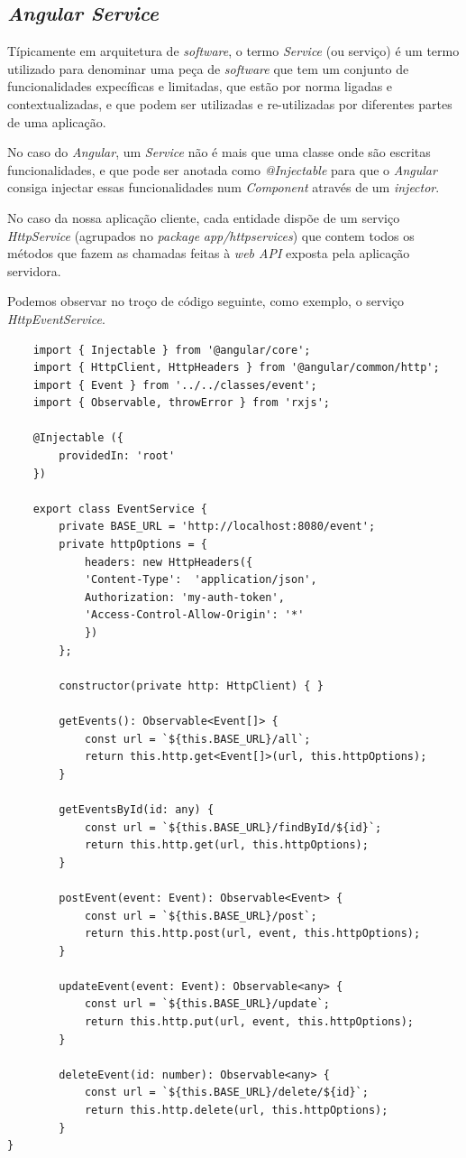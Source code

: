 \newpage

\subsection{\textit{Angular Service}}\label{sub412}

Típicamente em arquitetura de \emph{software}, o termo \emph{Service} (ou serviço) é um termo utilizado para denominar uma peça de \emph{software} que tem um conjunto de funcionalidades expecíficas e limitadas, que estão por norma ligadas e contextualizadas, e que podem ser utilizadas e re-utilizadas por diferentes partes de uma aplicação. 

No caso do \emph{Angular}, um \textit{Service} não é mais que uma classe onde são escritas funcionalidades, e que pode ser anotada como \emph{@Injectable} para que o \textit{Angular} consiga injectar essas funcionalidades num \textit{Component} através de um \textit{injector}. 

No caso da nossa aplicação cliente, cada entidade dispõe de um serviço \textit{HttpService} (agrupados no \textit{package} \textit{app/httpservices}) que contem todos os métodos que fazem as chamadas feitas à \textit{web API} exposta pela aplicação servidora. 

Podemos observar no troço de código seguinte, como exemplo, o serviço \textit{HttpEventService}.

\begin{lstlisting}
	import { Injectable } from '@angular/core';
	import { HttpClient, HttpHeaders } from '@angular/common/http';
	import { Event } from '../../classes/event';
	import { Observable, throwError } from 'rxjs';
	
	@Injectable ({
		providedIn: 'root'
	})
	
	export class EventService {
		private BASE_URL = 'http://localhost:8080/event';
		private httpOptions = {
			headers: new HttpHeaders({
			'Content-Type':  'application/json',
			Authorization: 'my-auth-token',
			'Access-Control-Allow-Origin': '*'
			})
		};
	
		constructor(private http: HttpClient) { }
		
		getEvents(): Observable<Event[]> {
			const url = `${this.BASE_URL}/all`;
			return this.http.get<Event[]>(url, this.httpOptions);
		}
		
		getEventsById(id: any) {
			const url = `${this.BASE_URL}/findById/${id}`;
			return this.http.get(url, this.httpOptions);
		}
		
		postEvent(event: Event): Observable<Event> {
			const url = `${this.BASE_URL}/post`;
			return this.http.post(url, event, this.httpOptions);
		}
		
		updateEvent(event: Event): Observable<any> {
			const url = `${this.BASE_URL}/update`;
			return this.http.put(url, event, this.httpOptions);
		}
		
		deleteEvent(id: number): Observable<any> {
			const url = `${this.BASE_URL}/delete/${id}`;
			return this.http.delete(url, this.httpOptions);
		}
}
\end{lstlisting}

